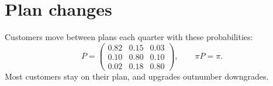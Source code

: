 \documentclass[11pt]{article}
\begin{document}
\section*{Plan changes}
Customers move between plans each quarter with these probabilities:
\[
  P = \begin{pmatrix} 0.82 & 0.15 & 0.03 \\ 0.10 & 0.80 & 0.10 \\ 0.02 & 0.18 & 0.80 \end{pmatrix},
  \qquad \pi P = \pi .
\]
Most customers stay on their plan, and upgrades outnumber downgrades.
\end{document}
